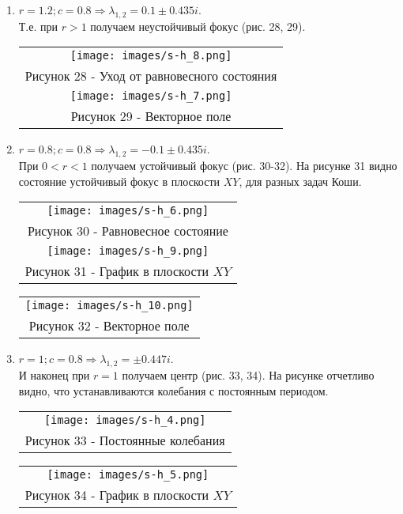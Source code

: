 \begin{enumerate}
  \item $r=1.2;c=0.8\Rightarrow \lambda_{1,2}=0.1\pm 0.435 i$.\\ Т.е. при $r>1$ получаем неустойчивый фокус (рис. 28, 29).
  \begin{center}
    \begin{tabular}{c}
      \texttt{[image: images/s-h\_8.png]}\\
      Рисунок 28 - Уход от равновесного состояния\\
      \texttt{[image: images/s-h\_7.png]}\\
      Рисунок 29 - Векторное поле
    \end{tabular}
  \end{center}
  \item $r=0.8;c=0.8\Rightarrow \lambda_{1,2}=-0.1\pm 0.435 i$.\\ При $0<r<1$ получаем устойчивый фокус (рис. 30-32).
На рисунке 31 видно состояние устойчивый фокус в плоскости $XY$, для разных задач Коши.
  \begin{center}
    \begin{tabular}{c}
      \texttt{[image: images/s-h\_6.png]}\\
      Рисунок 30 - Равновесное состояние\\
      \texttt{[image: images/s-h\_9.png]}\\
      Рисунок 31 - График в плоскости $XY$
      \end{tabular}
    \end{center}
  \begin{center}
    \begin{tabular}{c}
      \texttt{[image: images/s-h\_10.png]}\\
      Рисунок 32 - Векторное поле
    \end{tabular}
  \end{center}
  \item $r=1;c=0.8\Rightarrow \lambda_{1,2}=\pm 0.447 i$.\\ И наконец при $r=1$ получаем центр (рис. 33, 34). На рисунке отчетливо видно, что устанавливаются колебания с постоянным периодом.
  \begin{center}
    \begin{tabular}{c}
      \texttt{[image: images/s-h\_4.png]}\\
      Рисунок 33 - Постоянные колебания\\
      \end{tabular}
    \end{center}
    \begin{center}
      \begin{tabular}{c}
      \texttt{[image: images/s-h\_5.png]}\\
      Рисунок 34 - График в плоскости $XY$
    \end{tabular}
  \end{center}
\end{enumerate}

